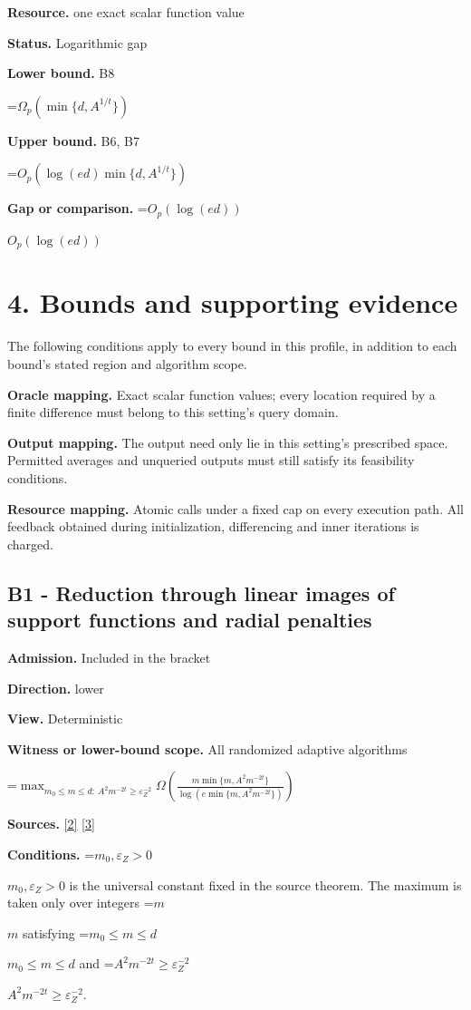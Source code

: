 \documentclass[10pt,a4paper]{article}
\newcommand{\AtlasMath}[1]{\par\begingroup\centering\setbox0=\hbox{$\displaystyle #1$}\ifdim\wd0>1.4\linewidth\typeout{ATLAS WIDE FORMULA: \the\wd0}\fi\ifdim\wd0>\linewidth\resizebox{\linewidth}{!}{\box0}\else\box0\fi\par\endgroup}
\newcommand{\AtlasInlineMath}[1]{\begingroup\setbox0=\hbox{$#1$}\ifdim\wd0>.4\linewidth\endgroup\AtlasMath{#1}\else\endgroup$#1$\fi}
\begin{document}
\textbf{Resource.} one exact scalar function value

\textbf{Status.} Logarithmic gap

\textbf{Lower bound.} B8

\AtlasMath{\Omega_p(\min\{d,A^{1/t}\})}
\textbf{Upper bound.} B6, B7

\AtlasMath{O_p(\log(ed)\min\{d,A^{1/t}\})}
\textbf{Gap or comparison.} \AtlasInlineMath{O_p(\log(ed))}

\section{4. Bounds and supporting evidence}
The following conditions apply to every bound in this profile, in addition to each bound's stated region and algorithm scope.

\textbf{Oracle mapping.} Exact scalar function values; every location required by a finite difference must belong to this setting's query domain.

\textbf{Output mapping.} The output need only lie in this setting's prescribed space. Permitted averages and unqueried outputs must still satisfy its feasibility conditions.

\textbf{Resource mapping.} Atomic calls under a fixed cap on every execution path. All feedback obtained during initialization, differencing and inner iterations is charged.

\subsection{B1 - Reduction through linear images of support functions and radial penalties}
\textbf{Admission.} Included in the bracket

\textbf{Direction.} lower

\textbf{View.} Deterministic

\textbf{Witness or lower-bound scope.} All randomized adaptive algorithms

\AtlasMath{\max_{m_0\le m\le d:\ A^2m^{-2t}\ge\varepsilon_Z^{-2}}\Omega\!\left(\frac{m\min\{m,A^2m^{-2t}\}}{\log(e\min\{m,A^2m^{-2t}\})}\right)}
\textbf{Sources.} \href{https://arxiv.org/html/2610.00345v1}{[2]} \href{https://arxiv.org/html/2607.16558v2}{[3]}

\textbf{Conditions.} \AtlasInlineMath{m_0,\varepsilon_Z>0} is the universal constant fixed in the source theorem. The maximum is taken only over integers \AtlasInlineMath{m} satisfying \AtlasInlineMath{m_0\le m\le d} and \AtlasInlineMath{A^2m^{-2t}\ge\varepsilon_Z^{-2}}.
\end{document}
